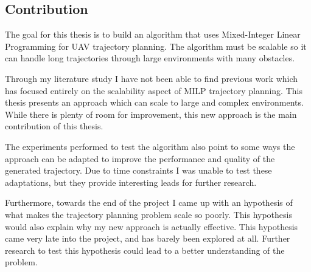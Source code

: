 \subsection{Contribution}
The goal for this thesis is to build an algorithm that uses Mixed-Integer Linear Programming for UAV trajectory planning. The algorithm must be scalable so it can handle long trajectories through large environments with many obstacles.
\par
Through my literature study I have not been able to find previous work which has focused entirely on the scalability aspect of MILP trajectory planning. This thesis presents an approach which can scale to large and complex environments. While there is plenty of room for improvement, this new approach is the main contribution of this thesis.
\par
The experiments performed to test the algorithm also point to some ways the approach can be adapted to improve the performance and quality of the generated trajectory. Due to time constraints I was unable to test these adaptations, but they provide interesting leads for further research.
\par
Furthermore, towards the end of the project I came up with an hypothesis of what makes the trajectory planning problem scale so poorly. This hypothesis would also explain why my new approach is actually effective. This hypothesis came very late into the project, and has barely been explored at all. Further research to test this hypothesis could lead to a better understanding of the problem.
